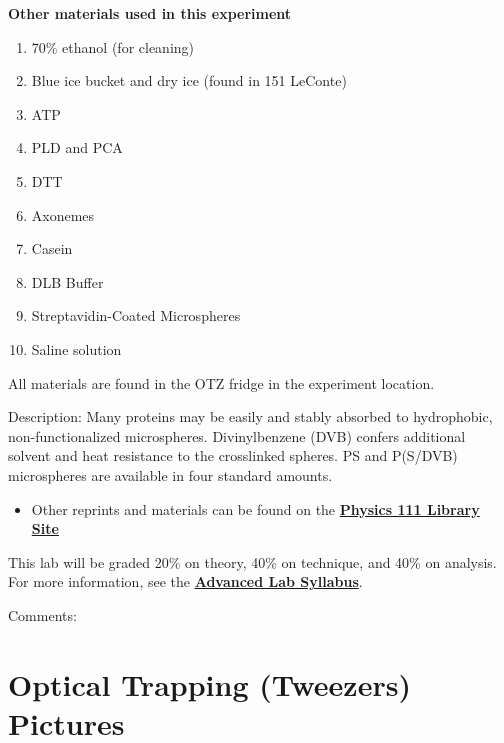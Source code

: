 \documentclass{../lab}
\begin{document}
\textbf{Other materials used in this experiment}

\begin{enumerate}
    \item 70\% ethanol (for cleaning)

    \item Blue ice bucket and dry ice (found in 151 LeConte)

    \item ATP

    \item PLD and PCA

    \item DTT

    \item Axonemes

    \item Casein

    \item DLB Buffer

    \item Streptavidin-Coated Microspheres

    \item Saline solution
\end{enumerate}

 All materials are found in the OTZ fridge in the experiment location.

Description: Many proteins may be easily and stably absorbed to hydrophobic, non-functionalized microspheres. Divinylbenzene (DVB) confers additional solvent and heat resistance to the crosslinked spheres. PS and P(S/DVB) microspheres are available in four standard amounts.

\begin{itemize}
    \item Other reprints and materials can be found on the \href{http://physics111.lib.berkeley.edu/Physics111/Reprints/OTZ/OTZ\_index.html}{\textbf{Physics 111 Library Site}}
\end{itemize}

This lab will be graded 20\% on theory, 40\% on technique, and 40\% on analysis. For more information, see the \href{\AdvancedLabSyllabus}{\textbf{Advanced Lab Syllabus}}.

Comments: \Feedback

\pagebreak

\section{Optical Trapping (Tweezers) Pictures}
\end{document}
